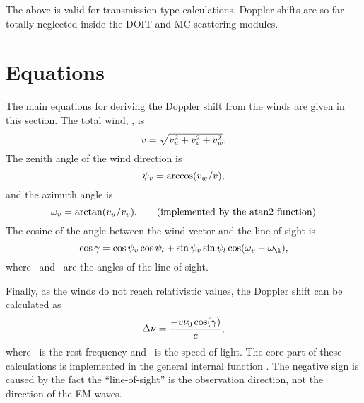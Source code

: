 The above is valid for transmission type calculations. Doppler shifts are so
far totally neglected inside the DOIT and MC scattering modules.



\section{Equations}
\label{sec:winds:eqs}

The main equations for deriving the Doppler shift from the winds are given in
this section. The total wind, \Wind, is
\begin{equation}
  v = \sqrt{v_u^2+v_v^2+v_w^2}.
  \label{eq:winds:total}
\end{equation}
The zenith angle of the wind direction is 
\begin{equation}
  \psi_{v} = \arccos(v_w/v),
  \label{eq:winds:za}
\end{equation}
and the azimuth angle is 
\begin{equation}
  \aAzmAng{\Wind} = \arctan(\WindWE/\WindSN). \qquad 
                           \mathrm{(implemented\ by\ the\ atan2\ function)}
  \label{eq:winds:aa}
\end{equation}
The cosine of the angle between the wind vector and the line-of-sight is
\begin{equation}
  \cos\gamma = \cos\aZntAng{\Wind}\cos\aZntAng{l} + 
               \sin\aZntAng{\Wind}\sin\aZntAng{l}
               \cos(\aAzmAng{\Wind}-\aAzmAng{\l}),
  \label{eq:winds:dang}
\end{equation}
where \ and \ are the angles of the line-of-sight. 

Finally, as the winds do not reach relativistic values, the Doppler shift can
be calculated as
\begin{equation}
  \Delta\nu = \frac{-v\nu_{0}\cos(\gamma)}{c},
\end{equation}
where \ is the rest frequency and \speedoflight\ is the speed of light.
The core part of these calculations is implemented in the general internal
function . The negative sign 
is caused by the fact the ``line-of-sight'' is the observation direction, not
the direction of the EM waves.



